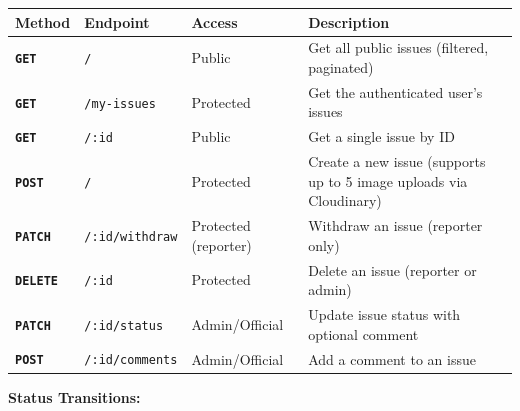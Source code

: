 \documentclass[12pt,a4paper]{article}
\newcommand{\GET}{\colorbox{routeget}{\texttt{\textbf{\color{white}GET}}}}
\newcommand{\POST}{\colorbox{routepost}{\texttt{\textbf{\color{white}POST}}}}
\newcommand{\PATCH}{\colorbox{routepatch}{\texttt{\textbf{\color{white}PATCH}}}}
\newcommand{\DELETE}{\colorbox{routedelete}{\texttt{\textbf{\color{white}DELETE}}}}
\begin{document}
\begin{longtable}{@{}p{1.2cm}p{4cm}p{2.8cm}p{4.5cm}@{}}
\toprule
\textbf{Method} & \textbf{Endpoint} & \textbf{Access} & \textbf{Description} \\
\midrule
\endhead
\GET    & \texttt{/}              & Public             & Get all public issues (filtered, paginated) \\[4pt]
\GET    & \texttt{/my-issues}     & Protected          & Get the authenticated user's issues \\[4pt]
\GET    & \texttt{/:id}           & Public             & Get a single issue by ID \\[4pt]
\POST   & \texttt{/}              & Protected          & Create a new issue (supports up to 5 image uploads via Cloudinary) \\[4pt]
\PATCH  & \texttt{/:id/withdraw}  & Protected (reporter) & Withdraw an issue (reporter only) \\[4pt]
\DELETE & \texttt{/:id}           & Protected          & Delete an issue (reporter or admin) \\[4pt]
\PATCH  & \texttt{/:id/status}    & Admin/Official     & Update issue status with optional comment \\[4pt]
\POST   & \texttt{/:id/comments}  & Admin/Official     & Add a comment to an issue \\
\bottomrule
\end{longtable}

\noindent\textbf{Status Transitions:}
\begin{center}
\end{center}
\end{document}
